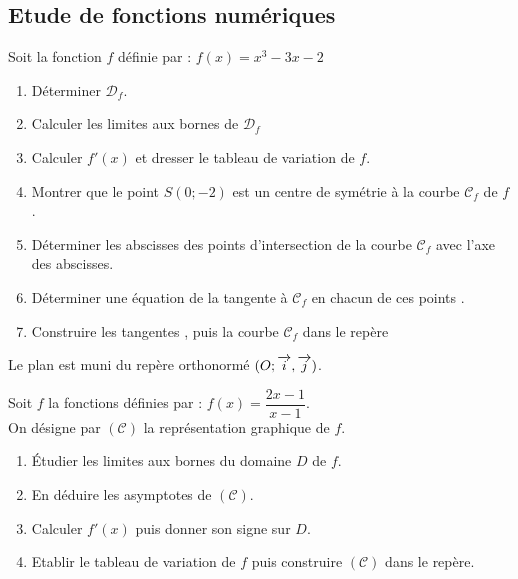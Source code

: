 \subsection*{Etude de fonctions numériques}
\begin{exercice}
 Soit la fonction  $f$ d\'efinie par : $f(x)=x^3-3x-2 $ 
\begin{enumerate}
 \item D\'eterminer $\mathscr{D}_f$.
 \item Calculer les limites aux bornes de $\mathscr{D}_f$
 \item Calculer $f'(x)$ et dresser le tableau de variation de $f$.
 \item Montrer que le point $S(0;-2)$ est un centre de sym\'etrie \`a la courbe  $\mathscr{C}_f$ de $f$ .
\item D\'eterminer les abscisses des points d'intersection de la courbe $\mathscr{C}_f$ avec l'axe des abscisses.
  \item D\'eterminer une \'equation de la tangente \`a $\mathscr{C}_f$ en chacun de ces points .
  \item Construire les tangentes , puis la courbe $\mathscr{C}_f$ dans le rep\`ere
\end{enumerate}
\end{exercice}
\begin{exercice}
 Le plan est muni du rep\`ere orthonorm\'e $(O ;\overrightarrow{i},\overrightarrow{j})$. 
 
 Soit $f$ la fonctions d\'efinies par : 
 $f(x)=\dfrac{2x-1}{x-1}$.\\
On d\'esigne par $(\mathscr{C})$  la repr\'esentation graphique  de $f$.
\begin{enumerate}
 \item Étudier les limites aux bornes du domaine $ D $ de  $f$.
 \item En déduire les asymptotes de $(\mathscr{C})$.
 \item Calculer $ f'(x) $ puis donner son signe sur $ D $.
 \item Etablir le tableau de variation de  $f$ puis construire $(\mathscr{C})$ dans le repère.
\end{enumerate}
\end{exercice}
